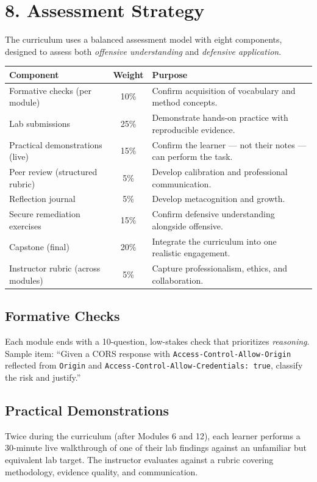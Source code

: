 \documentclass[11pt,letterpaper,oneside]{report}
\newcommand{\tool}[1]{\texttt{\small #1}}
\begin{document}
\section*{8. Assessment Strategy}
The curriculum uses a balanced assessment model with eight components, designed to assess both \emph{offensive understanding} and \emph{defensive application}.

\begin{tcolorbox}[callout,colback=afpaper,colframe=afnavy,colbacktitle=afnavy,title=Assessment Components and Weights]
\begin{tabularx}{\linewidth}{@{}R{4.6cm} c >{\raggedright\arraybackslash}X@{}}
\toprule
\sffamily\bfseries Component & \sffamily\bfseries Weight & \sffamily\bfseries Purpose \\
\midrule
Formative checks (per module) & 10\% & Confirm acquisition of vocabulary and method concepts.\\
Lab submissions & 25\% & Demonstrate hands-on practice with reproducible evidence.\\
Practical demonstrations (live) & 15\% & Confirm the learner --- not their notes --- can perform the task.\\
Peer review (structured rubric) & 5\%  & Develop calibration and professional communication.\\
Reflection journal & 5\%  & Develop metacognition and growth.\\
Secure remediation exercises & 15\% & Confirm defensive understanding alongside offensive.\\
Capstone (final) & 20\% & Integrate the curriculum into one realistic engagement.\\
Instructor rubric (across modules) & 5\%  & Capture professionalism, ethics, and collaboration.\\
\bottomrule
\end{tabularx}
\end{tcolorbox}

\subsection*{Formative Checks}
Each module ends with a 10-question, low-stakes check that prioritizes \emph{reasoning}. Sample item: ``Given a CORS response with \tool{Access-Control-Allow-Origin} reflected from \tool{Origin} and \tool{Access-Control-Allow-Credentials: true}, classify the risk and justify.''

\subsection*{Practical Demonstrations}
Twice during the curriculum (after Modules 6 and 12), each learner performs a 30-minute live walkthrough of one of their lab findings against an unfamiliar but equivalent lab target. The instructor evaluates against a rubric covering methodology, evidence quality, and communication.
\end{document}
